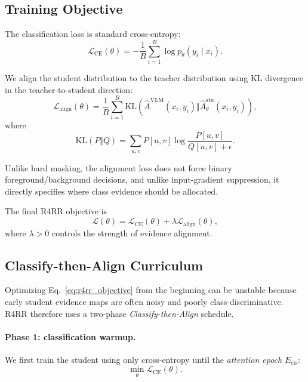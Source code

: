 \subsection{Training Objective}
\label{sec:objective}

The classification loss is standard cross-entropy:
\begin{equation}
\mathcal{L}_{\mathrm{CE}}(\theta)=-\frac{1}{B}
\sum_{i=1}^{B}
\log p_\theta(y_i\mid x_i).
\end{equation}

We align the student distribution to the teacher distribution using KL divergence in the teacher-to-student direction:
\begin{equation}
\mathcal{L}_{\mathrm{align}}(\theta)=\frac{1}{B}
\sum_{i=1}^{B}
\mathrm{KL}\left(
\hat{A}^{\mathrm{VLM}}(x_i,y_i)
\Vert
\hat{A}^{\mathrm{stu}}_\theta(x_i,y_i)
\right),
\end{equation}
where
\begin{equation}
\mathrm{KL}(P\Vert Q)=\sum_{u,v}P[u,v]\log\frac{P[u,v]}{Q[u,v]+\epsilon}.
\end{equation}

Unlike hard masking, the alignment loss does not force binary foreground/background decisions, and unlike input-gradient suppression, it directly specifies where class evidence should be allocated.


The final R4RR objective is
\begin{equation}
\mathcal{L}(\theta)=\mathcal{L}_{\mathrm{CE}}(\theta)
+
\lambda \mathcal{L}_{\mathrm{align}}(\theta),
\label{eq:r4rr_objective}
\end{equation}
where $\lambda>0$ controls the strength of evidence alignment.

\subsection{Classify-then-Align Curriculum}
\label{sec:classify_then_align}

Optimizing Eq.~\eqref{eq:r4rr_objective} from the beginning can be unstable because early student evidence maps are often noisy and poorly class-discriminative. R4RR therefore uses a two-phase \emph{Classify-then-Align} schedule.

\paragraph{Phase 1: classification warmup.}
We first train the student using only cross-entropy until the \emph{attention epoch} $E_{\mathrm{cls}}$:
\begin{equation}
\min_{\theta}\mathcal{L}_{\mathrm{CE}}(\theta).
\end{equation}

